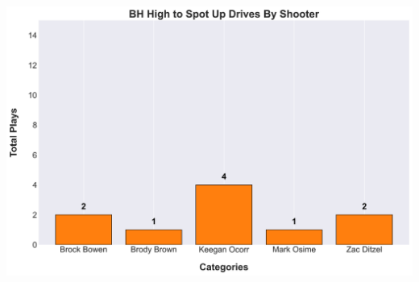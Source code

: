 \documentclass[a4paper,12pt]{article}
\begin{document}
\begin{table}[H]
{\begin{minipage}[t]{0.6\textwidth}
{\begin{tabular}
            \bottomrule
        \end{tabular}
        } %
    \end{minipage}
    } %
    \hfill %
    \begin{minipage}[c]{0.35\textwidth} %
        \flushright
        \includegraphics[width=\textwidth, height=.14\textheight]{images/PNR_PassHighDrivesPlayer_Freq.png} %
    \end{minipage}
\end{table}

\vspace{-1em} %
\vspace{-1em} %
\end{document}
